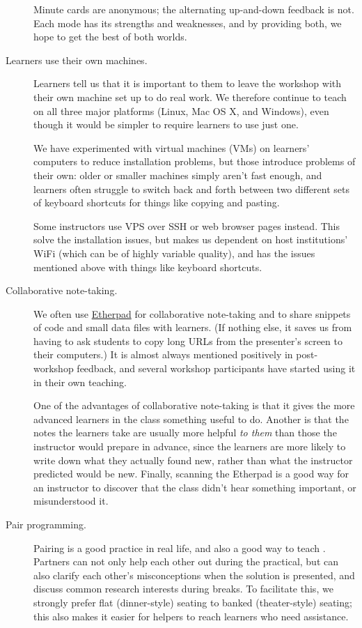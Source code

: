 \begin{description}
Minute cards are anonymous; the alternating up-and-down feedback is not.
Each mode has its strengths and weaknesses, and by providing both, we
hope to get the best of both worlds.
\item[Learners use their own machines.]
Learners tell us that it is important to them to leave the workshop with
their own machine set up to do real work. We therefore continue to teach
on all three major platforms (Linux, Mac OS X, and Windows), even though
it would be simpler to require learners to use just one.

We have experimented with virtual machines (VMs) on learners' computers
to reduce installation problems, but those introduce problems of their
own: older or smaller machines simply aren't fast enough, and learners
often struggle to switch back and forth between two different sets of
keyboard shortcuts for things like copying and pasting.

Some instructors use VPS over SSH or web browser pages instead. This
solve the installation issues, but makes us dependent on host
institutions' WiFi (which can be of highly variable quality), and has
the issues mentioned above with things like keyboard shortcuts.
\item[Collaborative note-taking.]
We often use \href{http://etherpad.org}{Etherpad} for collaborative
note-taking and to share snippets of code and small data files with
learners. (If nothing else, it saves us from having to ask students to
copy long URLs from the presenter's screen to their computers.) It is
almost always mentioned positively in post-workshop feedback, and
several workshop participants have started using it in their own
teaching.

One of the advantages of collaborative note-taking is that it gives the
more advanced learners in the class something useful to do. Another is
that the notes the learners take are usually more helpful \emph{to them}
than those the instructor would prepare in advance, since the learners
are more likely to write down what they actually found new, rather than
what the instructor predicted would be new. Finally, scanning the
Etherpad is a good way for an instructor to discover that the class
didn't hear something important, or misunderstood it.
\item[Pair programming.]
Pairing is a good practice in real life, and also a
good way to teach \cite{bib:porter-what-works}. Partners can not only help each other out during the
practical, but can also clarify each other's misconceptions when the
solution is presented, and discuss common research interests during
breaks. To facilitate this, we strongly prefer flat (dinner-style)
seating to banked (theater-style) seating; this also makes it easier for
helpers to reach learners who need assistance.


\end{description}
